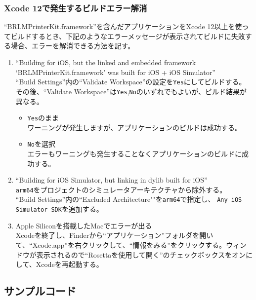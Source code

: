 \documentclass[a4paper]{ltjsreport}
\begin{document}
\subsubsection{Xcode 12で発生するビルドエラー解消}
``BRLMPrinterKit.framework''を含んだアプリケーションをXcode 12以上を使ってビルドするとき、下記のようなエラーメッセージが表示されてビルドに失敗する場合、エラーを解消できる方法を記す。
\begin{enumerate}[ケース1]
  \item ``Building for iOS, but the linked and embedded framework `BRLMPrinterKit.framework' was built for iOS + iOS Simulator''\\
        ``Build Settings''内の``Validate Workspace''の設定を\texttt{Yes}にしてビルドする。 \\
        その後、``Validate Workspace''は\texttt{Yes},\texttt{No}のいずれでもよいが、ビルド結果が異なる。
        \begin{itemize}
          \item \texttt{Yes}のまま\\
                ワーニングが発生しますが、アプリケーションのビルドは成功する。
          \item \texttt{No}を選択\\
                エラーもワーニングも発生することなくアプリケーションのビルドに成功する。
        \end{itemize}
  \item ``Building for iOS Simulator, but linking in dylib built for iOS''\\
        \texttt{arm64}をプロジェクトのシミュレータアーキテクチャから除外する。\\
        ``Build Settings''内の``Excluded Architecture""を\texttt{arm64}で指定し、 \texttt{Any iOS Simulator SDK}を追加する。
  \item Apple Siliconを搭載したMacでエラーが出る\\
        Xcodeを終了し、Finderから``アプリケーション''フォルダを開いて、``Xcode.app''を右クリックして、``情報をみる''をクリックする。ウィンドウが表示されるので``Rosettaを使用して開く''のチェックボックスをオンにして、Xcodeを再起動する。
\end{enumerate}
\subsection{サンプルコード}
\end{document}
